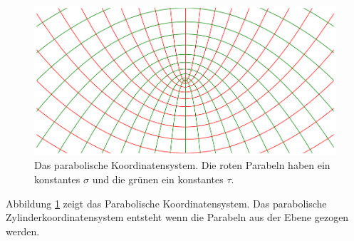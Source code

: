 \begin{figure}
    \centering
    \includegraphics[scale=0.4]{papers/parzyl/img/koordinaten.png}
    \caption{Das parabolische Koordinatensystem. Die roten Parabeln haben ein 
    konstantes $\sigma$ und die grünen ein konstantes $\tau$.}
    \label{parzyl:fig:cordinates}
\end{figure}

Abbildung \ref{parzyl:fig:cordinates} zeigt das Parabolische Koordinatensystem.
Das parabolische Zylinderkoordinatensystem entsteht wenn die Parabeln aus der
Ebene gezogen werden. 

